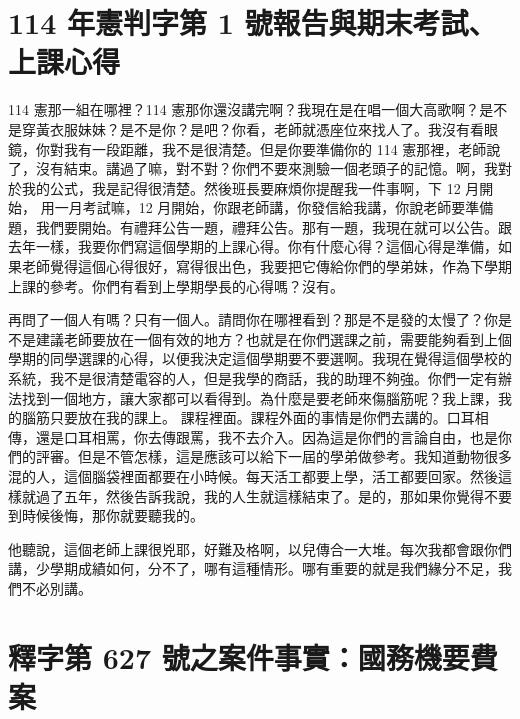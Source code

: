 \section{114 年憲判字第 1 號報告與期末考試、上課心得}

\hypertarget{c11:cue:5}{}114 憲那一組在哪裡？114 憲那你還沒講完啊？我現在是在唱一個大高歌啊？是不是穿黃衣服妹妹？是不是你？是吧？你看，老師就憑座位來找人了。我沒有看眼鏡，你對我有一段距離，我不是很清楚。但是你要準備你的 114 憲那裡，老師說了，沒有結束。講過了嘛，對不對？你們不要來測驗一個老頭子的記憶。啊，我對於我的公式，我是記得很清楚。然後班長要麻煩你提醒我一件事啊，下 12 月開始，
\hypertarget{c11:cue:6}{}用一月考試嘛，12 月開始，你跟老師講，你發信給我講，你說老師要準備題，我們要開始。有禮拜公告一題，禮拜公告。那有一題，我現在就可以公告。跟去年一樣，我要你們寫這個學期的上課心得。你有什麼心得？這個心得是準備，如果老師覺得這個心得很好，寫得很出色，我要把它傳給你們的學弟妹，作為下學期上課的參考。你們有看到上學期學長的心得嗎？沒有。

\hypertarget{c11:cue:7}{}再問了一個人有嗎？只有一個人。請問你在哪裡看到？那是不是發的太慢了？你是不是建議老師要放在一個有效的地方？也就是在你們選課之前，需要能夠看到上個學期的同學選課的心得，以便我決定這個學期要不要選啊。我現在覺得這個學校的系統，我不是很清楚電容的人，但是我學的商話，我的助理不夠強。你們一定有辦法找到一個地方，讓大家都可以看得到。為什麼是要老師來傷腦筋呢？我上課，我的腦筋只要放在我的課上。
\hypertarget{c11:cue:8}{}課程裡面。課程外面的事情是你們去講的。口耳相傳，還是口耳相罵，你去傳跟罵，我不去介入。因為這是你們的言論自由，也是你們的評審。但是不管怎樣，這是應該可以給下一屆的學弟做參考。我知道動物很多混的人，這個腦袋裡面都要在小時候。每天活工都要上學，活工都要回家。然後這樣就過了五年，然後告訴我說，我的人生就這樣結束了。是的，那如果你覺得不要到時候後悔，那你就要聽我的。

\hypertarget{c11:cue:9}{}他聽說，這個老師上課很兇耶，好難及格啊，以兒傳合一大堆。每次我都會跟你們講，少學期成績如何，分不了，哪有這種情形。哪有重要的就是我們緣分不足，我們不必別講。

\section{釋字第 627 號之案件事實：國務機要費案}

